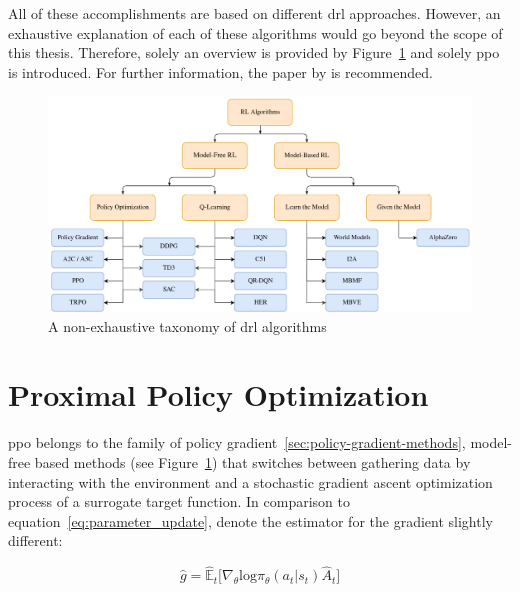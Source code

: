 \documentclass[draft,final]{vutinfth} %
\begin{document}
    All of these accomplishments are based on different \gls{drl} approaches.
    However, an exhaustive explanation of each of these algorithms would go beyond the scope of this thesis.
    Therefore, solely an overview is provided by Figure~\ref{fig:drl_taxonomy} and solely \gls{ppo} is introduced.
    For further information, the paper by \citeauthor{francois-lavet_introduction_2018} is recommended.

    \begin{figure}[h]
        \centering
        \includegraphics[width=\textwidth]{figures/drl_taxonomy.png}
        \caption[A non-exhaustive taxonomy of \gls{drl} algorithms]{A non-exhaustive taxonomy of \gls{drl} algorithms\protect\footnotemark}
        \label{fig:drl_taxonomy}
    \end{figure}



    \section{Proximal Policy Optimization}\label{sec:proximal-policy-optimization}
    \gls{ppo} belongs to the family of policy gradient~\eqref{sec:policy-gradient-methods}, model-free based methods (see Figure~\ref{fig:drl_taxonomy}) that switches between gathering data by interacting with the environment and a stochastic gradient ascent optimization process of a surrogate target function.
    In comparison to equation~\ref{eq:parameter_update}, \citeauthor{schulman_proximal_2017} denote the estimator for the gradient slightly different:

    \begin{equation}
        \hat{g}=\hat{\mathbb{E}}_t \bigg [\nabla_\theta \text{log}\pi_\theta(a_t|s_t)\hat{A}_t\bigg]\label{eq:policy_gradient_method_maximization}
    \end{equation}
\end{document}
